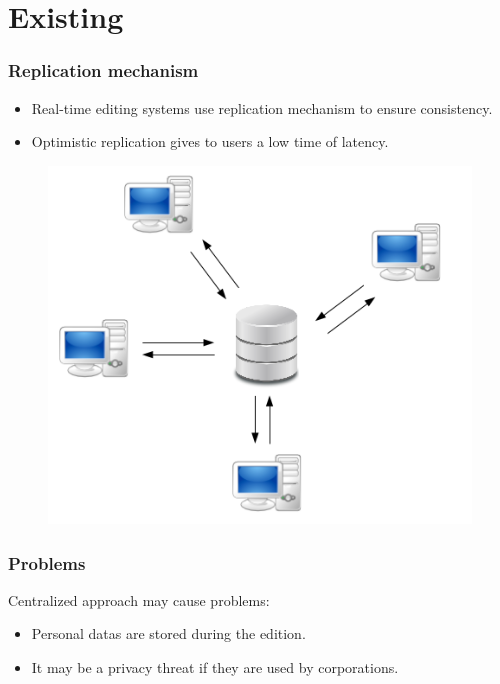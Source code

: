 \documentclass[14pt]{beamer}
\begin{document}
\section{Existing}
	\begin{frame}
		\frametitle{Replication mechanism}
		\begin{itemize}
    		\item Real-time editing systems use replication mechanism to ensure consistency.
    		\item Optimistic replication gives to users a low time of latency.
		\end{itemize}
		\begin{figure}
			\includegraphics[scale=0.3]{includes/replication.png}
	   	\end{figure}
	\end{frame}
	\begin{frame}
		\frametitle{Problems}
		Centralized approach may cause problems:
		\begin{itemize}
			\item Personal datas are stored during the edition.
			\item It may be a privacy threat if they are used by corporations.
		\end{itemize}
	\end{frame}
\end{document}
